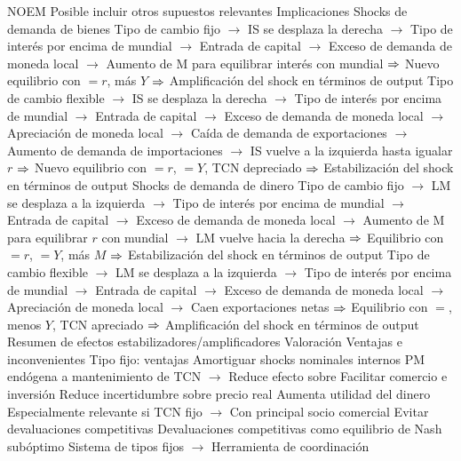 \documentclass{nuevotema}
\begin{document}
\begin{esquemal}
				\4 NOEM
				\4[] Posible incluir otros supuestos relevantes
				\4[] 
			\3 Implicaciones
				\4 Shocks de demanda de bienes
				\4[] Tipo de cambio fijo
				\4[] $\to$ IS se desplaza la derecha
				\4[] $\to$ Tipo de interés por encima de mundial
				\4[] $\to$ Entrada de capital
				\4[] $\to$ Exceso de demanda de moneda local
				\4[] $\to$ Aumento de M para equilibrar interés con mundial
				\4[] $\Rightarrow$ Nuevo equilibrio con $= r$, más $Y$
				\4[] $\Rightarrow$ Amplificación del shock en términos de output
				\4[] Tipo de cambio flexible
				\4[] $\to$ IS se desplaza la derecha
				\4[] $\to$ Tipo de interés por encima de mundial
				\4[] $\to$ Entrada de capital
				\4[] $\to$ Exceso de demanda de moneda local
				\4[] $\to$ Apreciación de moneda local
				\4[] $\to$ Caída de demanda de exportaciones
				\4[] $\to$ Aumento de demanda de importaciones
				\4[] $\to$ IS vuelve a la izquierda hasta igualar $r$
				\4[] $\Rightarrow$ Nuevo equilibrio con $=r$, $=Y$, TCN depreciado
				\4[] $\Rightarrow$ Estabilización del shock en términos de output
				\4 Shocks de demanda de dinero
				\4[] Tipo de cambio fijo
				\4[] $\to$ LM se desplaza a la izquierda
				\4[] $\to$ Tipo de interés por encima de mundial
				\4[] $\to$ Entrada de capital
				\4[] $\to$ Exceso de demanda de moneda local
				\4[] $\to$ Aumento de M para equilibrar $r$ con mundial
				\4[] $\to$ LM vuelve hacia la derecha
				\4[] $\Rightarrow$ Equilibrio con $=r$, $=Y$, más $M$
				\4[] $\Rightarrow$ Estabilización del shock en términos de output
				\4[] Tipo de cambio flexible
				\4[] $\to$ LM se desplaza a la izquierda
				\4[] $\to$ Tipo de interés por encima de mundial
				\4[] $\to$ Entrada de capital
				\4[] $\to$ Exceso de demanda de moneda local
				\4[] $\to$ Apreciación de moneda local
				\4[] $\to$ Caen exportaciones netas
				\4[] $\Rightarrow$ Equilibrio con $=$, menos $Y$, TCN apreciado
				\4[] $\Rightarrow$ Amplificación del shock en términos de output
				\4 Resumen de efectos estabilizadores/amplificadores
				\4[] 
			\3 Valoración
		\2 Ventajas e inconvenientes
			\3 Tipo fijo: ventajas 
				\4 Amortiguar shocks nominales internos
				\4[] PM endógena a mantenimiento de TCN
				\4[] $\to$ Reduce efecto sobre 
				\4 Facilitar comercio e inversión
				\4[] Reduce incertidumbre sobre precio real
				\4[] Aumenta utilidad del dinero
				\4[] Especialmente relevante si TCN fijo
				\4[] $\to$ Con principal socio comercial
				\4 Evitar devaluaciones competitivas
				\4[] Devaluaciones competitivas como equilibrio de Nash subóptimo
				\4[] Sistema de tipos fijos
				\4[] $\to$ Herramienta de coordinación

\end{esquemal}
\end{document}

